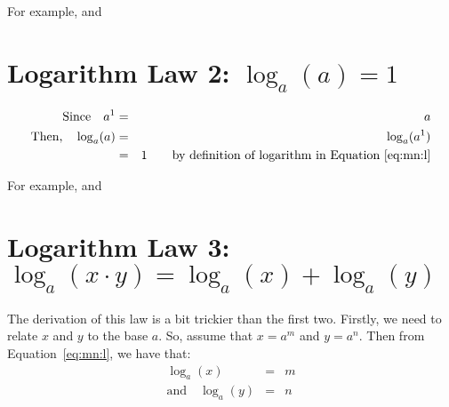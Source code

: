 For example,
and


\section{Logarithm Law 2: $\log_{a}(a) = 1$}
\begin{eqnarray*}
\mbox{Since}\quad a^1&=&a\\
\mbox{Then,}\quad \log_{a}(a) &=& \log_{a}(a^1)\\
&=&1\qquad \mbox{by definition of logarithm in Equation~\ref{eq:mn:l}}
\end{eqnarray*}

For example,
and



\section{Logarithm Law 3: $\log_{a}(x\cdot y) = \log_{a}(x) + \log_{a}(y)$}
The derivation of this law is a bit trickier than the first two. Firstly, we need to relate $x$ and $y$ to the base $a$. So, assume that $x=a^m$ and $y=a^n$. Then from Equation~\ref{eq:mn:l}, we have that:
\begin{eqnarray}
\label{eq:mn:loglaw3:1}
\log_{a}(x) &=&m\\
\label{eq:mn:loglaw3:2}
\mbox{and}\quad \log_{a}(y) &=&n
\end{eqnarray}


